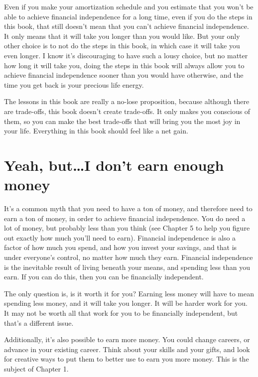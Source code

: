 Even if you make your amortization schedule and you estimate that you won't be able to achieve financial independence for a long time, even if you do the steps in this book, that still doesn't mean that you can't achieve financial independence. It only means that it will take you longer than you would like. But your only other choice is to not do the steps in this book, in which case it will take you even longer. I know it's discouraging to have such a lousy choice, but no matter how long it will take you, doing the steps in this book will always allow you to achieve financial independence sooner than you would have otherwise, and the time you get back is your precious life energy.

The lessons in this book are really a no-lose proposition, because although there are trade-offs, this book doesn't create trade-offs. It only makes you conscious of them, so you can make the best trade-offs that will bring you the most joy in your life. Everything in this book should feel like a net gain.

\section{Yeah, but\ldots I don't earn enough money}
It's a common myth that you need to have a ton of money, and therefore need to earn a ton of money, in order to achieve financial independence. You do need a lot of money, but probably less than you think (see Chapter 5 to help you figure out exactly how much you'll need to earn). Financial independence is also a factor of how much you spend, and how you invest your savings, and that is under everyone's control, no matter how much they earn. Financial independence is the inevitable result of living beneath your means, and spending less than you earn. If you can do this, then you can be financially independent.

The only question is, is it worth it for you? Earning less money will have to mean spending less money, and it will take you longer. It will be harder work for you. It may not be worth all that work for you to be financially independent, but that's a different issue.

Additionally, it's also possible to earn more money. You could change careers, or advance in your existing career. Think about your skills and your gifts, and look for creative ways to put them to better use to earn you more money. This is the subject of Chapter 1.

